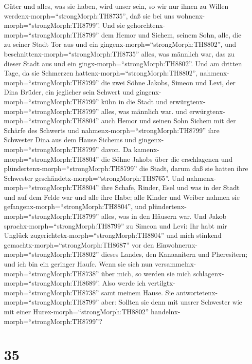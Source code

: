Güter und alles, was sie haben, wird unser sein, so wir nur ihnen zu
Willen werdenx-morph=``strongMorph:TH8735'', daß sie bei uns
wohnenx-morph=``strongMorph:TH8799''.  Und sie
gehorchtenx-morph=``strongMorph:TH8799'' dem Hemor und Sichem, seinem
Sohn, alle, die zu seiner Stadt Tor aus und ein
gingenx-morph=``strongMorph:TH8802'', und
beschnittenx-morph=``strongMorph:TH8735'' alles, was männlich war, das
zu dieser Stadt aus und ein gingx-morph=``strongMorph:TH8802''.
 Und am dritten Tage, da sie Schmerzen
hattenx-morph=``strongMorph:TH8802'',
nahmenx-morph=``strongMorph:TH8799'' die zwei Söhne Jakobs, Simeon und
Levi, der Dina Brüder, ein jeglicher sein Schwert und
gingenx-morph=``strongMorph:TH8799'' kühn in die Stadt und
erwürgtenx-morph=``strongMorph:TH8799'' alles, was männlich war.
 und erwürgtenx-morph=``strongMorph:TH8804'' auch Hemor und
seinen Sohn Sichem mit der Schärfe des Schwerts und
nahmenx-morph=``strongMorph:TH8799'' ihre Schwester Dina aus dem Hause
Sichems und gingenx-morph=``strongMorph:TH8799'' davon.  Da
kamenx-morph=``strongMorph:TH8804'' die Söhne Jakobs über die
erschlagenen und plündertenx-morph=``strongMorph:TH8799'' die Stadt,
darum daß sie hatten ihre Schwester
geschändetx-morph=``strongMorph:TH8765''.  Und
nahmenx-morph=``strongMorph:TH8804'' ihre Schafe, Rinder, Esel und was
in der Stadt und auf dem Felde war  und alle ihre Habe;
alle Kinder und Weiber nahmen sie
gefangenx-morph=``strongMorph:TH8804'', und
plündertenx-morph=``strongMorph:TH8799'' alles, was in den Häusern war.
 Und Jakob sprachx-morph=``strongMorph:TH8799'' zu Simeon
und Levi: Ihr habt mir Unglück zugerichtetx-morph=``strongMorph:TH8804''
und mich stinkend gemachtx-morph=``strongMorph:TH8687'' vor den
Einwohnernx-morph=``strongMorph:TH8802'' dieses Landes, den Kanaanitern
und Pheresitern; und ich bin ein geringer Haufe. Wenn sie sich nun
versammelnx-morph=``strongMorph:TH8738'' über mich, so werden sie mich
schlagenx-morph=``strongMorph:TH8689''. Also werde ich
vertilgtx-morph=``strongMorph:TH8738'' samt meinem Hause. 
Sie antwortetenx-morph=``strongMorph:TH8799'' aber: Sollten sie denn mit
unsrer Schwester wie mit einer Hurex-morph=``strongMorph:TH8802''
handelnx-morph=``strongMorph:TH8799''?

\hypertarget{section-34}{%
\section{35}\label{section-34}}

